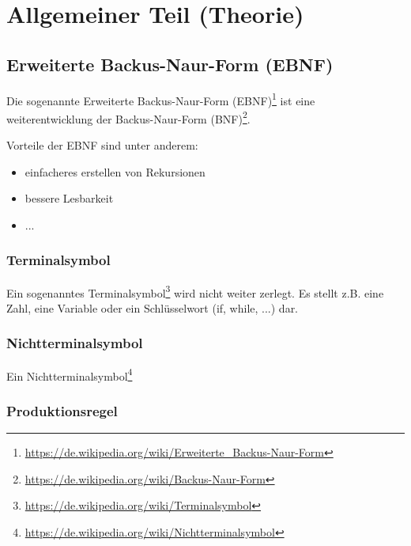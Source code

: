 

\section{Allgemeiner Teil (Theorie)}

\subsection{Erweiterte Backus-Naur-Form (EBNF)}

Die sogenannte Erweiterte Backus-Naur-Form (EBNF)\footnote{\url{https://de.wikipedia.org/wiki/Erweiterte_Backus-Naur-Form}} ist eine weiterentwicklung der Backus-Naur-Form (BNF)\footnote{\url{https://de.wikipedia.org/wiki/Backus-Naur-Form}}.

Vorteile der EBNF sind unter anderem:

\begin{itemize}
  \item einfacheres erstellen von Rekursionen
  \item bessere Lesbarkeit
  \item ...
\end{itemize}

\subsubsection{Terminalsymbol}

Ein sogenanntes Terminalsymbol\footnote{\url{https://de.wikipedia.org/wiki/Terminalsymbol}} wird nicht weiter zerlegt. Es stellt z.B. eine Zahl, eine Variable oder ein Schlüsselwort (if, while, ...) dar.

\subsubsection{Nichtterminalsymbol}

Ein Nichtterminalsymbol\footnote{\url{https://de.wikipedia.org/wiki/Nichtterminalsymbol}}

\subsubsection{Produktionsregel}


